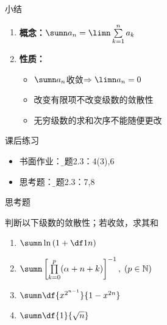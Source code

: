 \begin{frame}[<+->]{小结}
	\linespread{1.5}
	\begin{enumerate}
	  \item {\bf 概念：}$\sumn a_n=\limn\sum\limits_{k=1}^na_k$
	  \item {\bf 性质：}
	  \begin{itemize}
	    \item $\sumn a_n$收敛$\Rightarrow\limn a_n=0$
	    \item 改变有限项不改变级数的敛散性
	    \item \alert{无穷级数的求和次序不能随便更改}
	  \end{itemize}
	\end{enumerate}
	\begin{exampleblock}{课后练习}
	  \begin{itemize}
	    \item 书面作业：{\b 习题2.3：4(3),6}
	    \item 思考题：{\b 习题2.3：7,8}
	  \end{itemize}
	\end{exampleblock}
\end{frame}

\begin{frame}{思考题}
	\linespread{1.2}
	\begin{exampleblock}{判断以下级数的敛散性；若收敛，求其和}
		\begin{enumerate}
		  \item $\sumn\ln\left(1+\df 1n\right)$
		  \item
		  $\sumn\left[\prod\limits_{k=0}^p(\alpha+n+k)\right]^{-1},\;(p\in\mathbb{N})$
		  \item $\sumn\df{x^{2^{n-1}}}{1-x^{2n}}$
		  \item $\sumn\df{1}{\sqrt n}$
		\end{enumerate}
	\end{exampleblock}
\end{frame}

